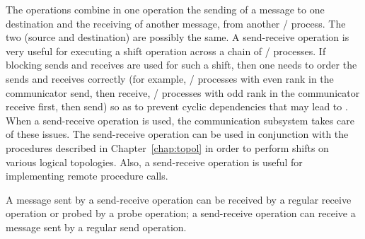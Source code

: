 The  operations combine in one operation the sending of a
message to one destination and the receiving of another message, from
another \MPI/ process.  The two (source and destination) are possibly the same.
A send-receive operation is
very useful for executing a shift operation across a chain of
\MPI/ processes.  If blocking sends and receives are used for such a shift,
then one needs to order the sends and receives correctly (for
example, \MPI/ processes with even rank in the communicator
send, then receive, \MPI/ processes with odd rank in the communicator receive first, then send) so as to prevent
cyclic dependencies that may lead to .  When a send-receive
operation is used, the communication subsystem takes care of
these issues.  The send-receive operation can be used in conjunction
with the procedures described in Chapter~\ref{chap:topol} in order to
perform shifts on various logical topologies.
Also, a send-receive operation is useful for implementing
remote procedure calls.


A message sent by a
send-receive operation can be received by a regular receive
operation or probed by a probe operation; a send-receive operation can
receive a message sent by a regular send operation.


